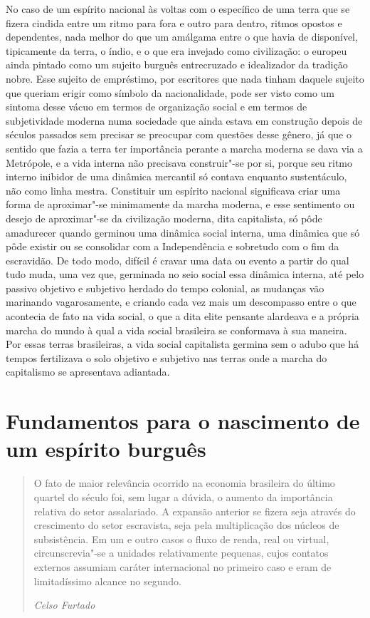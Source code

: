 No caso de um espírito nacional às voltas com o específico de uma terra
que se fizera cindida entre um ritmo para fora e outro para dentro,
ritmos opostos e dependentes, nada melhor do que um amálgama entre o que
havia de disponível, tipicamente da terra, o índio, e o que era invejado
como civilização: o europeu ainda pintado como um sujeito burguês
entrecruzado e idealizador da tradição nobre. Esse sujeito de
empréstimo, por escritores que nada tinham daquele sujeito que queriam
erigir como símbolo da nacionalidade, pode ser visto como um sintoma
desse vácuo em termos de organização social e em termos de subjetividade
moderna numa sociedade que ainda estava em construção depois de séculos
passados sem precisar se preocupar com questões desse gênero, já que o
sentido que fazia a terra ter importância perante a marcha moderna se
dava via a Metrópole, e a vida interna não precisava construir"-se por
si, porque seu ritmo interno inibidor de uma dinâmica mercantil só
contava enquanto sustentáculo, não como linha mestra. Constituir um
espírito nacional significava criar uma forma de aproximar"-se
minimamente da marcha moderna, e esse sentimento ou desejo de
aproximar"-se da civilização moderna, dita capitalista, só pôde
amadurecer quando germinou uma dinâmica social interna, uma dinâmica que
só pôde existir ou se consolidar com a Independência e sobretudo com o
fim da escravidão. De todo modo, difícil é cravar uma data ou evento a
partir do qual tudo muda, uma vez que, germinada no seio social essa
dinâmica interna, até pelo passivo objetivo e subjetivo herdado do tempo
colonial, as mudanças vão marinando vagarosamente, e criando cada vez
mais um descompasso entre o que acontecia de fato na vida social, o que
a dita elite pensante alardeava e a própria marcha do mundo à qual a
vida social brasileira se conformava à sua maneira. Por essas terras
brasileiras, a vida social capitalista germina sem o adubo que há tempos
fertilizava o solo objetivo e subjetivo nas terras onde a marcha do
capitalismo se apresentava adiantada.

\section{Fundamentos para o nascimento de um espírito burguês}

\begin{quote}
O fato de maior relevância ocorrido na economia brasileira do último
quartel do século  foi, sem lugar a dúvida, o aumento da importância
relativa do setor assalariado. A expansão anterior se fizera seja
através do crescimento do setor escravista, seja pela multiplicação dos
núcleos de subsistência. Em um e outro casos o fluxo de renda, real ou
virtual, circunscrevia"-se a unidades relativamente pequenas, cujos
contatos externos assumiam caráter internacional no primeiro caso e eram
de limitadíssimo alcance no segundo.

\emph{Celso Furtado}
\end{quote}

